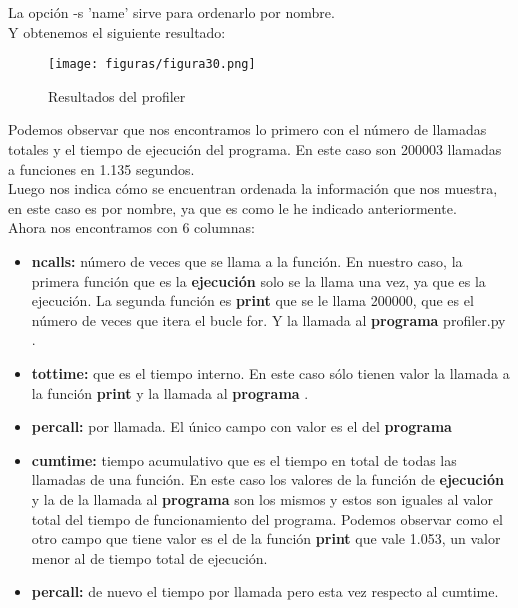 La opción -s 'name' sirve para ordenarlo por nombre.\\
Y obtenemos el siguiente resultado:\\

\begin{figure}[H] %
	\centering
	\texttt{[image: figuras/figura30.png]}  %
	\label{figura30}
	
	\caption{Resultados del profiler} 
\end{figure}

Podemos observar que nos encontramos lo primero con el número de llamadas totales y el tiempo de ejecución del programa. En este caso son 200003 llamadas a funciones en 1.135 segundos.\\
Luego nos indica cómo se encuentran ordenada la información que nos muestra, en este caso es por nombre, ya que es como le he indicado anteriormente.\\
Ahora nos encontramos con 6 columnas:
\begin{itemize}
	\item \textbf{ncalls: } número de veces que se llama a la función. En nuestro caso, la primera función que es la \textbf{ejecución} solo se la llama una vez, ya que es la ejecución. La segunda función es \textbf{print} que se le llama 200000, que es el número de veces que itera el bucle for. Y la llamada al \textbf{programa} profiler.py .
	\item \textbf{tottime: } que es el tiempo interno. En este caso sólo tienen valor la llamada a la función \textbf{print} y la llamada al \textbf{programa} .
	\item \textbf{percall: } por llamada. El único campo con valor es el del \textbf{programa}
	\item \textbf{cumtime: } tiempo acumulativo que es el tiempo en total de todas las llamadas de una función. En este caso los valores de la función de \textbf{ejecución} y la de la llamada al \textbf{programa} son los mismos y estos son iguales al valor total del tiempo de funcionamiento del programa. Podemos observar como el otro campo que tiene valor es el de la función \textbf{print}  que vale 1.053, un valor menor al de tiempo total de ejecución.
	\item \textbf{percall: } de nuevo el tiempo por llamada pero esta vez respecto al cumtime.
\end{itemize}

